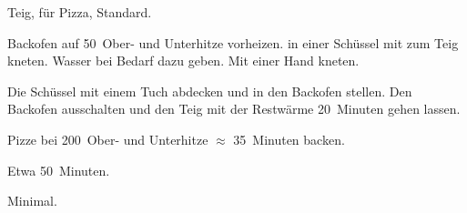 \begin{recipe}{Teig, für Pizza, Standard.}
	\item[Vorbereitung] Backofen auf 50\textcelsius~Ober- und Unterhitze vorheizen.
	 in einer Schüssel mit
	 zum Teig kneten. 
	\hint Wasser bei Bedarf dazu geben. 
	\hint Mit einer Hand kneten.
	\item[Gehen lassen] Die Schüssel mit einem Tuch abdecken und in den Backofen stellen. Den Backofen ausschalten und den Teig mit der Restwärme 20~Minuten gehen lassen.
	\item[Pizza machen]
	\item[Backen] Pizze bei 200\textcelsius~Ober- und Unterhitze $\approx$ 35~Minuten backen.
	\item[Zubereitungszeit] Etwa 50~Minuten.
	\item[Abwaschaufwand] Minimal.
\end{recipe}